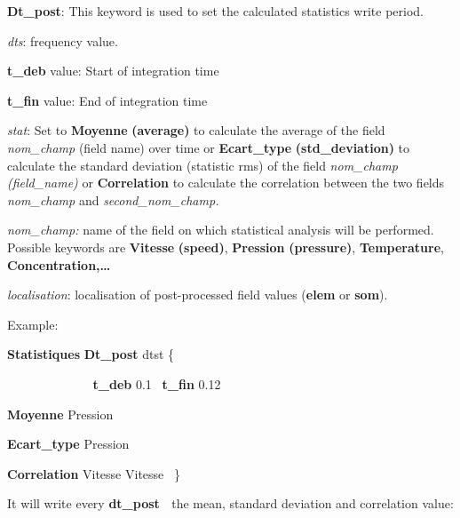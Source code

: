


\textbf{Dt\_post}: This keyword is used to set the calculated statistics write period.

\textit{dts}: frequency value.

\textbf{t\_deb} value: Start of integration time

\textbf{t\_fin} value: End of integration time


\bigskip

\textit{stat}: Set to \textbf{Moyenne}\textbf{ (average)} to calculate the average of the field
\textit{nom\_champ} (field name) over time or \textbf{Ecart\_type}\textbf{
(std\_deviation)} to calculate the standard deviation (statistic rms) of the field \textit{nom\_champ (field\_name)} or
\textbf{Correlation} to calculate the correlation between the two fields \textit{nom\_champ
}and\textit{ second\_nom\_champ.}


\bigskip

\textit{nom\_champ:} name of the field on which statistical analysis will be performed. Possible keywords are
\textbf{Vitesse}\textbf{ (speed)}, \textbf{Pression}\textbf{ (pressure)},
\textbf{Temperature}, \textbf{Concentration}\textbf{,{\dots}}


\bigskip

\textit{localisation}: localisation of post-processed field values (\textbf{elem} or \textbf{som}).


\bigskip

Example:

\textbf{Statistiques}\textbf{ Dt\_post}\textbf{ }dtst \{

\textbf{\ \ \ \ \ \ \ \ \ \ \ \ t\_deb} 0.1 \ \textbf{t\_fin} 0.12

\textbf{Moyenne} Pression

\textbf{Ecart\_type}\textbf{ }Pression 

\textbf{Correlation}\textbf{ }Vitesse Vitesse \ \}

It will write every \textbf{dt\_post \ }the mean, standard deviation and correlation value:

